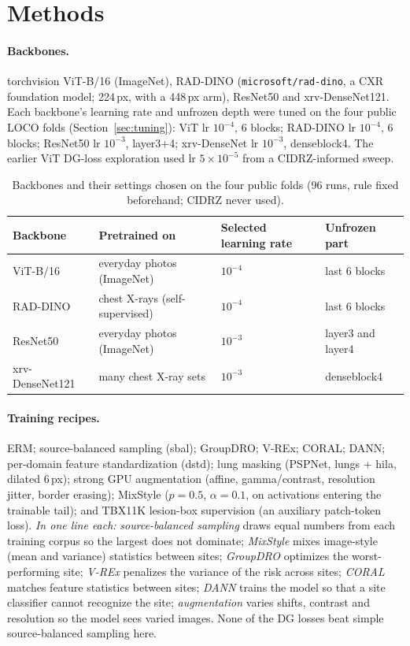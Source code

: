 \documentclass[10pt,a4paper]{article}
\begin{document}
\section{Methods}\label{sec:methods}
\paragraph{Backbones.} torchvision ViT-B/16 (ImageNet), RAD-DINO (\texttt{microsoft/rad-dino}, a CXR foundation model; 224\,px, with a 448\,px arm), ResNet50 and xrv-DenseNet121. Each backbone's learning rate and unfrozen depth were tuned on the four public LOCO folds (Section~\ref{sec:tuning}): ViT lr $10^{-4}$, 6 blocks; RAD-DINO lr $10^{-4}$, 6 blocks; ResNet50 lr $10^{-3}$, layer3+4; xrv-DenseNet lr $10^{-3}$, denseblock4. The earlier ViT DG-loss exploration used lr $5\times10^{-5}$ from a CIDRZ-informed sweep.
\begin{table}[H]\centering\small
\begin{tabular}{llll}\toprule
Backbone & Pretrained on & Selected learning rate & Unfrozen part\\\midrule
ViT-B/16 & everyday photos (ImageNet) & $10^{-4}$ & last 6 blocks\\
RAD-DINO & chest X-rays (self-supervised) & $10^{-4}$ & last 6 blocks\\
ResNet50 & everyday photos (ImageNet) & $10^{-3}$ & layer3 and layer4\\
xrv-DenseNet121 & many chest X-ray sets & $10^{-3}$ & denseblock4\\\bottomrule
\end{tabular}\caption{Backbones and their settings chosen on the four public folds (96 runs, rule fixed beforehand; CIDRZ never used).}\end{table}
\paragraph{Training recipes.} ERM; source-balanced sampling (sbal); GroupDRO; V-REx; CORAL; DANN; per-domain feature standardization (dstd); lung masking (PSPNet, lungs + hila, dilated 6\,px); strong GPU augmentation (affine, gamma/contrast, resolution jitter, border erasing); MixStyle ($p=0.5$, $\alpha=0.1$, on activations entering the trainable tail); and TBX11K lesion-box supervision (an auxiliary patch-token loss). \emph{In one line each:} \emph{source-balanced sampling} draws equal numbers from each training corpus so the largest does not dominate; \emph{MixStyle} mixes image-style (mean and variance) statistics between sites; \emph{GroupDRO} optimizes the worst-performing site; \emph{V-REx} penalizes the variance of the risk across sites; \emph{CORAL} matches feature statistics between sites; \emph{DANN} trains the model so that a site classifier cannot recognize the site; \emph{augmentation} varies shifts, contrast and resolution so the model sees varied images. None of the DG losses beat simple source-balanced sampling here.
\end{document}
